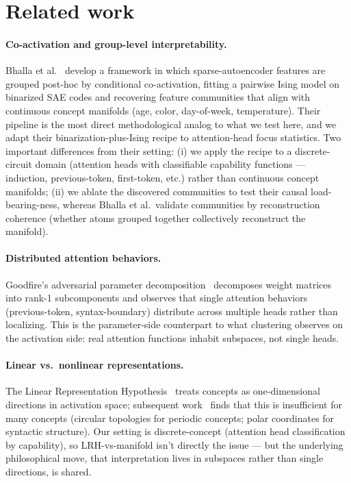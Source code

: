 \documentclass[11pt]{article}
\begin{document}
\section{Related work}

\paragraph{Co-activation and group-level interpretability.}
Bhalla et al.~\cite{bhalla2026} develop a framework in which
sparse-autoencoder features are grouped post-hoc by conditional
co-activation, fitting a pairwise Ising model on binarized SAE codes and
recovering feature communities that align with continuous concept manifolds
(age, color, day-of-week, temperature). Their pipeline is the most direct
methodological analog to what we test here, and we adapt their
binarization-plus-Ising recipe to attention-head focus statistics. Two
important differences from their setting: (i) we apply the recipe to a
discrete-circuit domain (attention heads with classifiable capability
functions --- induction, previous-token, first-token, etc.) rather than
continuous concept manifolds; (ii) we ablate the discovered communities to
test their causal load-bearing-ness, whereas Bhalla et al.\ validate
communities by reconstruction coherence (whether atoms grouped together
collectively reconstruct the manifold).

\paragraph{Distributed attention behaviors.}
Goodfire's adversarial parameter decomposition~\cite{goodfire2026} decomposes
weight matrices into rank-1 subcomponents and observes that single attention
behaviors (previous-token, syntax-boundary) distribute across multiple heads
rather than localizing. This is the parameter-side counterpart to what
clustering observes on the activation side: real attention functions inhabit
subspaces, not single heads.

\paragraph{Linear vs.\ nonlinear representations.}
The Linear Representation Hypothesis~\cite{park2024geometry,park2023lrh}
treats concepts as one-dimensional directions in activation space;
subsequent work~\cite{engels2024,kantamneni2025} finds that this is
insufficient for many concepts (circular topologies for periodic concepts;
polar coordinates for syntactic structure). Our setting is discrete-concept
(attention head classification by capability), so LRH-vs-manifold isn't
directly the issue --- but the underlying philosophical move, that
interpretation lives in subspaces rather than single directions, is shared.
\end{document}

